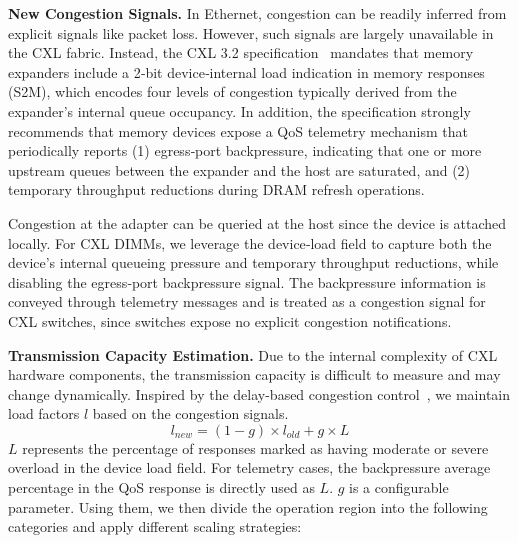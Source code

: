 \noindent
{\bf New Congestion Signals.} In Ethernet, congestion can be readily inferred from explicit signals like packet loss.
However, such signals are largely unavailable in the CXL fabric. Instead, the CXL 3.2 specification~\cite{cxl-spec} mandates that memory expanders include a 2‑bit device‑internal load indication in memory responses (S2M), which encodes four levels of congestion typically derived from the expander’s internal queue occupancy. In addition, the specification strongly recommends that memory devices expose a QoS telemetry mechanism that periodically reports (1) egress‑port backpressure, indicating that one or more upstream queues between the expander and the host are saturated, and (2) temporary throughput reductions %
during DRAM refresh operations.

Congestion at the adapter can be queried at the host since the device is attached locally. For CXL DIMMs, we leverage the device‑load field to capture both the device’s internal queueing pressure and temporary throughput reductions, while disabling the egress‑port backpressure signal. The backpressure information is conveyed through telemetry messages and is treated as a congestion signal for CXL switches, since switches expose no explicit congestion notifications.


\noindent
{\bf Transmission Capacity Estimation.}
Due to the internal complexity of CXL hardware components, the transmission capacity is difficult to measure and may change dynamically. Inspired by the delay-based congestion control~\cite{tcpvegas-sigcomm94, timely-sigcomm15, dctcp-sigcomm10}, we maintain load factors \(l\) based on the congestion signals.
\begin{equation}
    l_{new} = (1 - g) \times l_{old} + g \times L
\end{equation}
\(L\) represents the percentage of responses marked as having moderate or severe overload in the device load field. For telemetry cases, the backpressure average percentage in the QoS response is directly used as \(L\). \(g\) is a configurable parameter. Using them, we then divide the operation region into the following categories and apply different scaling strategies:

